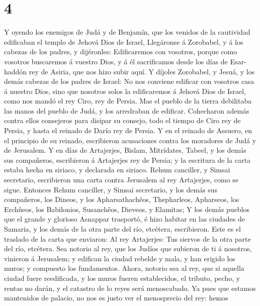 \hypertarget{section-3}{%
\section{4}\label{section-3}}

 Y oyendo los enemigos de Judá y de Benjamín, que los
venidos de la cautividad edificaban el templo de Jehová Dios de Israel,
 Llegáronse á Zorobabel, y á los cabezas de los padres, y
dijéronles: Edificaremos con vosotros, porque como vosotros buscaremos á
vuestro Dios, y á él sacrificamos desde los días de Esar-haddón rey de
Asiria, que nos hizo subir aquí.  Y díjoles Zorobabel, y
Jesuá, y los demás cabezas de los padres de Israel: No nos conviene
edificar con vosotros casa á nuestro Dios, sino que nosotros solos la
edificaremos á Jehová Dios de Israel, como nos mandó el rey Ciro, rey de
Persia.  Mas el pueblo de la tierra debilitaba las manos del
pueblo de Judá, y los arredraban de edificar.  Cohecharon
además contra ellos consejeros para disipar su consejo, todo el tiempo
de Ciro rey de Persia, y hasta el reinado de Darío rey de Persia.
 Y en el reinado de Assuero, en el principio de su reinado,
escribieron acusaciones contra los moradores de Judá y de Jerusalem.
 Y en días de Artajerjes, Bislam, Mitrídates, Tabeel, y los
demás sus compañeros, escribieron á Artajerjes rey de Persia; y la
escritura de la carta estaba hecha en siriaco, y declarada en siriaco.
 Rehum canciller, y Simsai secretario, escribieron una carta
contra Jerusalem al rey Artajerjes, como se sigue.  Entonces
Rehum canciller, y Simsai secretario, y los demás sus compañeros, los
Dineos, y los Apharsathachêos, Thepharleos, Apharseos, los Erchûeos, los
Babilonios, Susanchêos, Dieveos, y Elamitas;  Y los demás
pueblos que el grande y glorioso Asnappar trasportó, é hizo habitar en
las ciudades de Samaria, y los demás de la otra parte del río, etcétera,
escribieron.  Este es el traslado de la carta que enviaron:
Al rey Artajerjes: Tus siervos de la otra parte del río, etcétera.
 Sea notorio al rey, que los Judíos que subieron de ti á
nosotros, vinieron á Jerusalem; y edifican la ciudad rebelde y mala, y
han erigido los muros; y compuesto los fundamentos.  Ahora,
notorio sea al rey, que si aquella ciudad fuere reedificada, y los muros
fueren establecidos, el tributo, pecho, y rentas no darán, y el catastro
de lo reyes será menoscabado.  Ya pues que estamos
mantenidos de palacio, no nos es justo ver el menosprecio del rey: hemos
